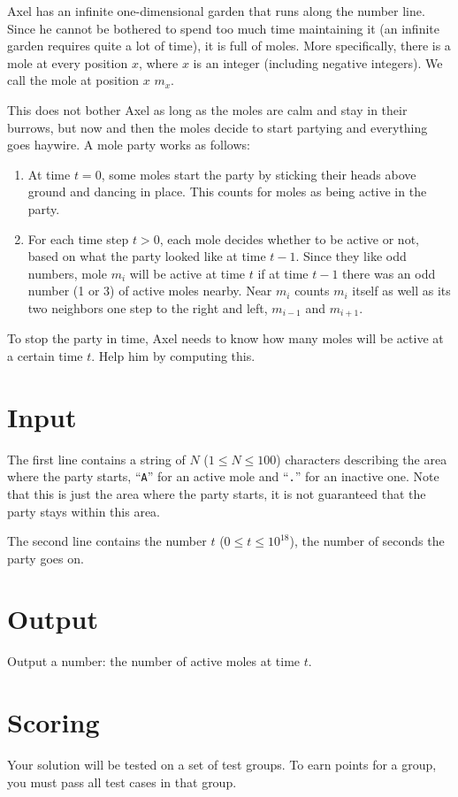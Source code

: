 
Axel has an infinite one-dimensional garden that runs along the number line. Since he cannot be bothered to spend too much time maintaining it (an infinite garden requires quite a lot of time), it is full of moles. More specifically, there is a mole at every position $x$, where $x$ is an integer (including negative integers). We call the mole at position $x$ $m_x$.

This does not bother Axel as long as the moles are calm and stay in their burrows, but now and then the moles decide to start partying and everything goes haywire. A mole party works as follows:
\begin{enumerate}
\item At time $t=0$, some moles start the party by sticking their heads above ground and dancing in place. This counts for moles as being active in the party.
\item For each time step $t > 0$, each mole decides whether to be active or not, based on what the party looked like at time $t-1$. Since they like odd numbers, mole $m_i$ will be active at time $t$ if at time $t-1$ there was an odd number (1 or 3) of active moles nearby. Near $m_i$ counts $m_i$ itself as well as its two neighbors one step to the right and left, $m_{i-1}$ and $m_{i+1}$.
\end{enumerate}

To stop the party in time, Axel needs to know how many moles will be active at a certain time $t$. Help him by computing this.

\section*{Input}
The first line contains a string of $N$ ($1 \leq N \leq 100$) characters describing the area where the party starts, ``\texttt{A}''
for an active mole and ``\texttt{.}'' for an inactive one. Note that this is just the area where the party starts, it
is not guaranteed that the party stays within this area.

The second line contains the number $t$ ($0 \leq t \leq 10^{18}$), the number of seconds the party goes on.

\section*{Output}
Output a number: the number of active moles at time $t$.


\section*{Scoring}
Your solution will be tested on a set of test groups.
To earn points for a group, you must pass all test cases in that group.


